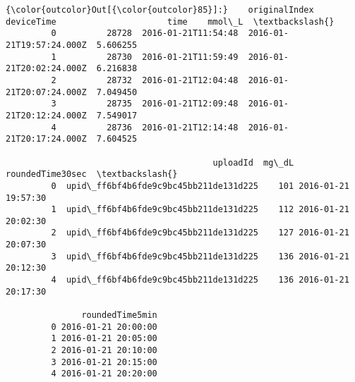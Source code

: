 \documentclass[11pt]{article}
\begin{document}
\begin{Verbatim}[commandchars=\\\{\}]
{\color{outcolor}Out[{\color{outcolor}85}]:}    originalIndex           deviceTime                      time    mmol\_L  \textbackslash{}
         0          28728  2016-01-21T11:54:48  2016-01-21T19:57:24.000Z  5.606255   
         1          28730  2016-01-21T11:59:49  2016-01-21T20:02:24.000Z  6.216838   
         2          28732  2016-01-21T12:04:48  2016-01-21T20:07:24.000Z  7.049450   
         3          28735  2016-01-21T12:09:48  2016-01-21T20:12:24.000Z  7.549017   
         4          28736  2016-01-21T12:14:48  2016-01-21T20:17:24.000Z  7.604525   
         
                                         uploadId  mg\_dL    roundedTime30sec  \textbackslash{}
         0  upid\_ff6bf4b6fde9c9bc45bb211de131d225    101 2016-01-21 19:57:30   
         1  upid\_ff6bf4b6fde9c9bc45bb211de131d225    112 2016-01-21 20:02:30   
         2  upid\_ff6bf4b6fde9c9bc45bb211de131d225    127 2016-01-21 20:07:30   
         3  upid\_ff6bf4b6fde9c9bc45bb211de131d225    136 2016-01-21 20:12:30   
         4  upid\_ff6bf4b6fde9c9bc45bb211de131d225    136 2016-01-21 20:17:30   
         
               roundedTime5min  
         0 2016-01-21 20:00:00  
         1 2016-01-21 20:05:00  
         2 2016-01-21 20:10:00  
         3 2016-01-21 20:15:00  
         4 2016-01-21 20:20:00  
\end{Verbatim}
            
\end{document}
